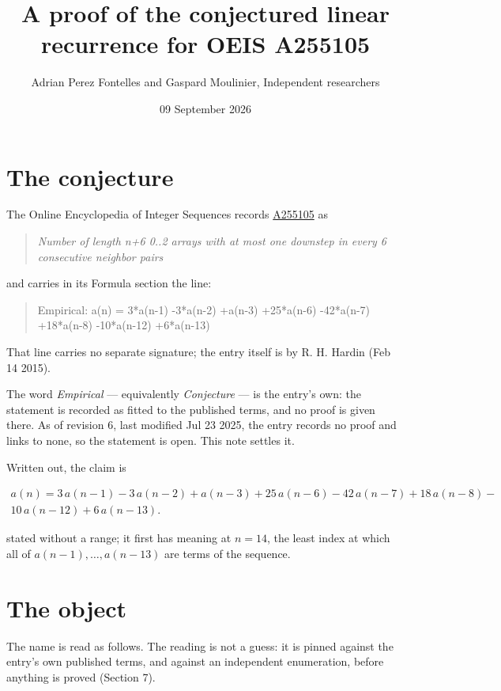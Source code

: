 \documentclass[11pt]{article}
\title{A proof of the conjectured linear recurrence for OEIS A255105}
\author{Adrian Perez Fontelles and Gaspard Moulinier, Independent researchers}
\date{09 September 2026}
\theoremstyle{definition}
\begin{document}
\maketitle
\section{The conjecture}

The Online Encyclopedia of Integer Sequences records \href{https://oeis.org/A255105}{A255105} as

\begin{quote}\itshape Number of length n+6 0..2 arrays with at most one downstep in every 6 consecutive neighbor pairs\end{quote}

and carries in its Formula section the line:

\begin{quote}\ttfamily Empirical: a(n) = 3*a(n-1) -3*a(n-2) +a(n-3) +25*a(n-6) -42*a(n-7) +18*a(n-8) -10*a(n-12) +6*a(n-13)\end{quote}

That line carries no separate signature; the entry itself is by R. H. Hardin (Feb 14 2015).

The word {\itshape Empirical} --- equivalently {\itshape Conjecture} --- is the entry's own: the statement is recorded as fitted to the published terms, and no proof is given there. As of revision 6, last modified Jul 23 2025, the entry records no proof and links to none, so the statement is open. This note settles it.

Written out, the claim is

\begin{multline*} a(n) = 3\,a(n-1) - 3\,a(n-2) + a(n-3) + 25\,a(n-6) - 42\,a(n-7) + 18\,a(n-8) - \\ 10\,a(n-12) + 6\,a(n-13). \end{multline*}

stated without a range; it first has meaning at $n = 14$, the least index at which all of $a(n-1),\dots,a(n-13)$ are terms of the sequence.

\section{The object}

The name is read as follows. The reading is not a guess: it is pinned against the entry's own published terms, and against an independent enumeration, before anything is proved (Section 7).
\end{document}

